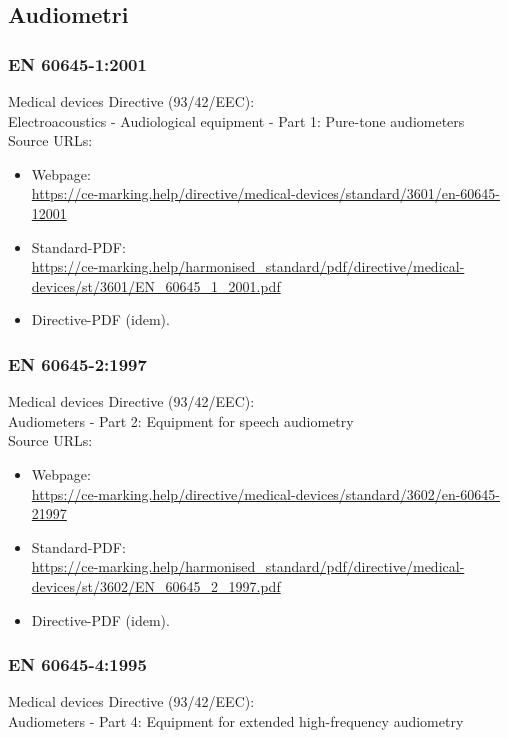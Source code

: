 \documentclass[12pt,]{article}
\begin{document}
	\subsection{Audiometri}
	
	\subsubsection{EN 60645-1:2001}
	Medical devices Directive (93/42/EEC):\\
	Electroacoustics - Audiological equipment - Part 1: Pure-tone audiometers\\
	
	Source URLs:
	\begin{itemize}
		\item Webpage:\\
		\url{https://ce-marking.help/directive/medical-devices/standard/3601/en-60645-12001}
		
		\item Standard-PDF:\\
		\url{https://ce-marking.help/harmonised_standard/pdf/directive/medical-devices/st/3601/EN_60645_1_2001.pdf}
		
		\item Directive-PDF (idem).
	\end{itemize}

	\subsubsection{EN 60645-2:1997}
	Medical devices Directive (93/42/EEC):\\
	Audiometers - Part 2: Equipment for speech audiometry\\
	
	Source URLs:
	\begin{itemize}
		\item Webpage:\\
		\url{https://ce-marking.help/directive/medical-devices/standard/3602/en-60645-21997}
		
		\item Standard-PDF:\\
		\url{https://ce-marking.help/harmonised_standard/pdf/directive/medical-devices/st/3602/EN_60645_2_1997.pdf}
		
		\item Directive-PDF (idem).
	\end{itemize}

	\subsubsection{EN 60645-4:1995}
	Medical devices Directive (93/42/EEC):\\
	Audiometers - Part 4: Equipment for extended high-frequency audiometry\\
	
\end{document}
